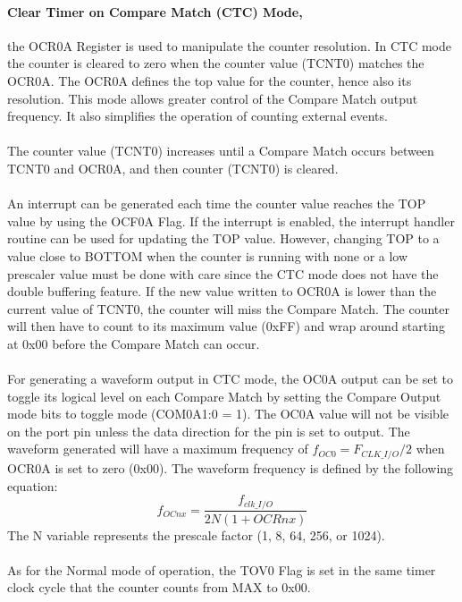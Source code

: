 \documentclass[english]{article}
\begin{document}
\paragraph{Clear Timer on Compare Match (CTC) Mode,} the OCR0A Register is used to manipulate the counter resolution. In CTC mode the counter is cleared to zero when the counter value (TCNT0) matches the OCR0A. The OCR0A defines the top value for the counter, hence also its resolution. This mode allows greater control of the Compare Match output frequency. It also simplifies the operation of counting external events.\\\\
The counter value (TCNT0) increases until a Compare Match occurs between TCNT0 and OCR0A, and then counter (TCNT0) is cleared.\\\\
An interrupt can be generated each time the counter value reaches the TOP value by using the
OCF0A Flag. If the interrupt is enabled, the interrupt handler routine can be used for updating
the TOP value. However, changing TOP to a value close to BOTTOM when the counter is running with none or a low prescaler value must be done with care since the CTC mode does not have the double buffering feature. If the new value written to OCR0A is lower than the current value of TCNT0, the counter will miss the Compare Match. The counter will then have to count to its maximum value (0xFF) and wrap around starting at 0x00 before the Compare Match can occur.\\\\
For generating a waveform output in CTC mode, the OC0A output can be set to toggle its logical level on each Compare Match by setting the Compare Output mode bits to toggle mode (COM0A1:0 = 1). The OC0A value will not be visible on the port pin unless the data direction for the pin is set to output. The waveform generated will have a maximum frequency of $f_{OC0}=F_{CLK\_I/O}/2$ when OCR0A is set to zero (0x00). The waveform frequency is defined by the following equation:
$$
f_{OCnx}=\frac{f_{clk\_I/O}}{2N(1+OCRnx)}
$$
The N variable represents the prescale factor (1, 8, 64, 256, or 1024).\\\\
As for the Normal mode of operation, the TOV0 Flag is set in the same timer clock cycle that the
counter counts from MAX to 0x00.
\end{document}
